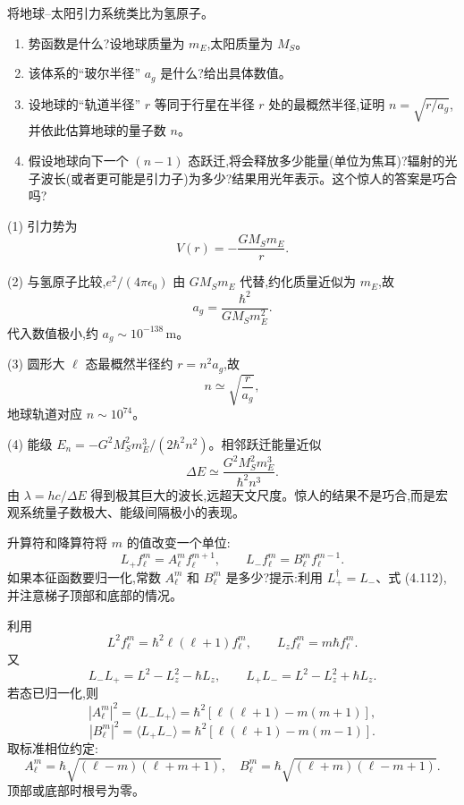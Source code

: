 \begin{question}
将地球--太阳引力系统类比为氢原子。
\begin{enumerate}
\item 势函数是什么?设地球质量为 $m_E$,太阳质量为 $M_S$。
\item 该体系的“玻尔半径” $a_g$ 是什么?给出具体数值。
\item 设地球的“轨道半径” $r$ 等同于行星在半径 $r$ 处的最概然半径,证明 $n=\sqrt{r/a_g}$,并依此估算地球的量子数 $n$。
\item 假设地球向下一个 $(n-1)$ 态跃迁,将会释放多少能量(单位为焦耳)?辐射的光子波长(或者更可能是引力子)为多少?结果用光年表示。这个惊人的答案是巧合吗?
\end{enumerate}
\end{question}
\begin{solution}

(1) 引力势为
\[
V(r)=-\frac{GM_Sm_E}{r}.
\]

(2) 与氢原子比较,$e^2/(4\pi\epsilon_0)$ 由 $GM_Sm_E$ 代替,约化质量近似为 $m_E$,故
\[
a_g=\frac{\hbar^2}{G M_S m_E^2}.
\]
代入数值极小,约 $a_g\sim 10^{-138}\,\mathrm m$。

(3) 圆形大 $\ell$ 态最概然半径约 $r=n^2a_g$,故
\[
n\simeq\sqrt{\frac{r}{a_g}},
\]
地球轨道对应 $n\sim 10^{74}$。

(4) 能级 $E_n=-G^2M_S^2m_E^3/(2\hbar^2n^2)$。相邻跃迁能量近似
\[
\Delta E\simeq \frac{G^2M_S^2m_E^3}{\hbar^2n^3}.
\]
由 $\lambda=hc/\Delta E$ 得到极其巨大的波长,远超天文尺度。惊人的结果不是巧合,而是宏观系统量子数极大、能级间隔极小的表现。

\end{solution}

\begin{question}
升算符和降算符将 $m$ 的值改变一个单位:
\[
L_+f_\ell^m=A_\ell^m f_\ell^{m+1},\qquad
L_-f_\ell^m=B_\ell^m f_\ell^{m-1}.
\]
如果本征函数要归一化,常数 $A_\ell^m$ 和 $B_\ell^m$ 是多少?提示:利用 $L_+^\dagger=L_-$、式 (4.112),并注意梯子顶部和底部的情况。

\par\smallskip
{}

\end{question}
\begin{solution}

利用
\[
L^2f_\ell^m=\hbar^2\ell(\ell+1)f_\ell^m,
\qquad L_zf_\ell^m=m\hbar f_\ell^m.
\]
又
\[
L_-L_+=L^2-L_z^2-\hbar L_z,
\qquad
L_+L_-=L^2-L_z^2+\hbar L_z.
\]
若态已归一化,则
\[
|A_\ell^m|^2=\langle L_-L_+\rangle
=\hbar^2[\ell(\ell+1)-m(m+1)],
\]
\[
|B_\ell^m|^2=\langle L_+L_-\rangle
=\hbar^2[\ell(\ell+1)-m(m-1)].
\]
取标准相位约定:
\[
A_\ell^m=\hbar\sqrt{(\ell-m)(\ell+m+1)},
\quad
B_\ell^m=\hbar\sqrt{(\ell+m)(\ell-m+1)}.
\]
顶部或底部时根号为零。

\end{solution}

